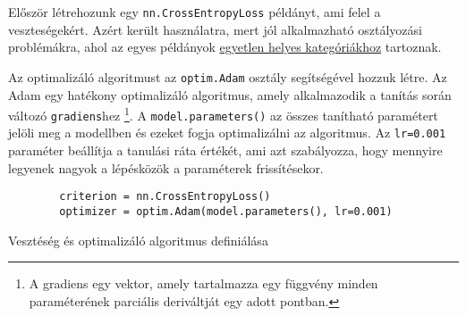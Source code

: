 \newpage
\begin{flushleft}
    Először létrehozunk egy \verb|nn.CrossEntropyLoss| példányt, ami felel a veszteségekért. Azért került használatra, mert jól alkalmazható osztályozási problémákra, ahol az egyes példányok \underline{egyetlen helyes kategóriákhoz} tartoznak.
\end{flushleft}
\begin{flushleft}
    Az optimalizáló algoritmust az \verb|optim.Adam| osztály segítségével hozzuk létre. Az Adam egy hatékony optimalizáló algoritmus, amely alkalmazodik a tanítás során változó \verb|gradiens|hez \footnote{A gradiens egy vektor, amely tartalmazza egy függvény minden paraméterének parciális deriváltját egy adott pontban.}. A \verb|model.parameters()| az összes tanítható paramétert jelöli meg a modellben és ezeket fogja optimalizálni az algoritmus. Az \verb|lr=0.001| paraméter beállítja a tanulási ráta értékét, ami azt szabályozza, hogy mennyire legyenek nagyok a lépésközök a paraméterek frissítésekor.
\end{flushleft}
\begin{listing}[H]
    \begin{verbatim}
        criterion = nn.CrossEntropyLoss()
        optimizer = optim.Adam(model.parameters(), lr=0.001)
    \end{verbatim}
    \caption{Vesztéség és optimalizáló algoritmus definiálása}
    \label{code:loss}
\end{listing}

